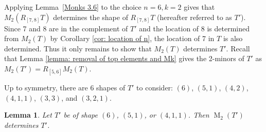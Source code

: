 \documentclass[12pt]{amsart}
\newtheorem{lemma}[theorem]{Lemma}
\theoremstyle{definition}
\theoremstyle{remark}
\numberwithin{equation}{section}
\numberwithin{figure}{section}
\newcommand{\M}{\operatorname{M}}
\begin{document}
Applying Lemma~\ref{Monks 3.6} to the choice $n=6, k=2$ gives that $M_2(R_{[7,8]}T)$ determines the shape of $R_{[7,8]}T$ (hereafter referred to as $T'$). Since 7 and 8 are in the complement of $T'$ and the location of 8 is determined from $M_2(T)$ by Corollary \ref{cor: location of n},  the location of 7 in $T$ is also determined. Thus it only remains to show that $M_2(T)$ determines $T'$. Recall that Lemma  \ref{lemma: removal of top elements and Mk} gives the 2-minors of $T'$ as $M_2(T')=R_{[5,6]}M_2(T)$.
	
	Up to symmetry, there are 6 shapes of $T'$ to consider:
	$(6)$, $(5,1)$, $(4,2)$, $(4,1,1)$, $(3,3)$, and $(3,2,1)$.  %
	
	
	
	
\begin{lemma} \label{hanging shapes}
	Let $T'$ be of shape $(6)$, $(5,1)$, or  $(4,1,1)$. Then $\M_2(T')$ determines $T'$.
\end{lemma}
\end{document}
